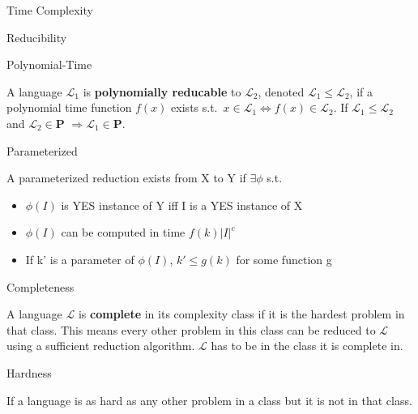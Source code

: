 \documentclass[12pt, letterpaper]{article}
\newcommand{\Ll}{\mathscr{L}}
\newcommand{\Ls}{\(\Ll\)}
\newcommand{\p}{\textbf{P}}
\begin{document}
\begin{section}{Time Complexity}
  \begin{subsection}{Reducibility}

    \begin{subsubsection}{Polynomial-Time}

      A language \(\Ll_{1}\) is \textbf{polynomially reducable} to \(\Ll_{2}\),
      denoted \(\Ll_{1} \leq \Ll_{2}\), if a polynomial time function \(f(x)\)
      exists s.t.\ \(x \in \Ll_{1} \iff f(x) \in \Ll_{2}\). If \(\Ll_{1} \leq
      \Ll_{2}\) and \(\Ll_{2} \in \p\) \(\Rightarrow \Ll_{1} \in \p\).

    \end{subsubsection}

    \begin{subsubsection}{Parameterized}

      A parameterized reduction exists from X to Y if \(\exists \phi\) s.t.\
      \begin{itemize}
        \item \(\phi(I)\) is YES instance of Y iff I is a YES instance of X
        \item \(\phi(I)\) can be computed in time \(f(k)| I |^{c}\)
        \item If k' is a parameter of \(\phi(I)\), \(k' \leq g(k)\) for some
              function g

      \end{itemize}

    \end{subsubsection}

  \end{subsection}

  \begin{subsection}{Completeness}

    A language \Ls{} is \textbf{complete} in its complexity class if it is the
    hardest problem in that class. This means every other problem in this class
    can be reduced to \Ls{} using a sufficient reduction algorithm. \Ls{} has
    to be in the class it is complete in.

    \begin{subsubsection}{Hardness}

      If a language is as hard as any other problem in a class but it is not in
      that class.

    \end{subsubsection}

  \end{subsection}

\end{section}
\end{document}

